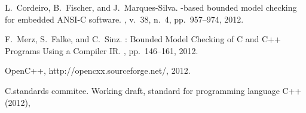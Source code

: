 \documentclass[a4paper]{llncs}
\begin{document}
{\begin{thebibliography}{10}
L.~Cordeiro, B.~Fischer, and J.~Marques-Silva.
-based bounded model checking for embedded {ANSI-C} software.
, v.\ 38, n.\ 4, pp.\ 957--974, 2012. 

F.~Merz, S.~Falke, and C.~Sinz.
: Bounded Model Checking of C and C++ Programs Using a Compiler IR.
, pp.\ 146--161, 2012. 

OpenC++, http://opencxx.sourceforge.net/, 2012.

C.standards commitee. Working draft, standard for programming language C++ (2012),



\end{thebibliography}}
\end{document}
